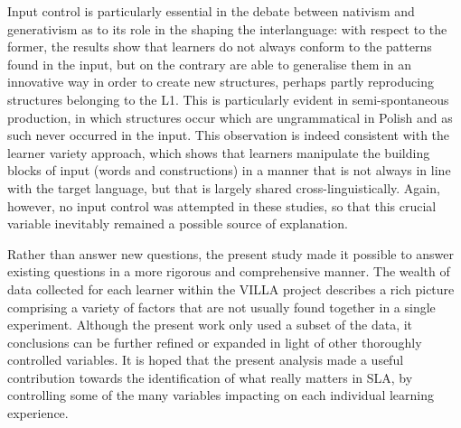 Input control is particularly essential in the debate between nativism and generativism as to its role in the shaping the interlanguage: with respect to the former, the results show that learners do not always conform to the patterns found in the input, but on the contrary are able to generalise them in an innovative way in order to create new structures, perhaps partly reproducing structures belonging to the L1. This is particularly evident in semi-spontaneous production, in which structures occur which are ungrammatical in Polish and as such never occurred in the input. This observation is indeed consistent with the learner variety approach, which shows that learners manipulate the building blocks of input (words and constructions) in a manner that is not always in line with the target language, but that is largely shared cross-linguistically. Again, however, no input control was attempted in these studies, so that this crucial variable inevitably remained a possible source of explanation.

Rather than answer new questions, the present study made it possible to answer existing questions in a more rigorous and comprehensive manner. The wealth of data collected for each learner within the VILLA project describes a rich picture comprising a variety of factors that are not usually found together in a single experiment. Although the present work only used a subset of the data, it conclusions can be further refined or expanded in light of other thoroughly controlled variables. It is hoped that the present analysis made a useful contribution towards the identification of what really matters in SLA, by controlling some of the many variables impacting on each individual learning experience.
